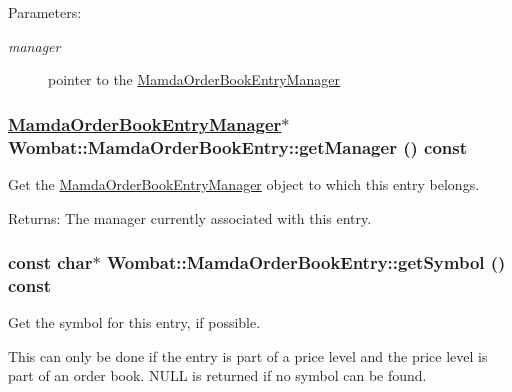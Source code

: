 \begin{Desc}
\item[Parameters:]
\begin{description}
\item[{\em manager}]pointer to the \hyperlink{classWombat_1_1MamdaOrderBookEntryManager}{Mamda\-Order\-Book\-Entry\-Manager} \end{description}
\end{Desc}
\hypertarget{classWombat_1_1MamdaOrderBookEntry_3f55243859e0552706d4ac6bfa762a36}{
\subsubsection[getManager]{\setlength{\rightskip}{0pt plus 5cm}\hyperlink{classWombat_1_1MamdaOrderBookEntryManager}{Mamda\-Order\-Book\-Entry\-Manager}$\ast$ Wombat::Mamda\-Order\-Book\-Entry::get\-Manager () const}}
\label{classWombat_1_1MamdaOrderBookEntry_3f55243859e0552706d4ac6bfa762a36}


Get the \hyperlink{classWombat_1_1MamdaOrderBookEntryManager}{Mamda\-Order\-Book\-Entry\-Manager} object to which this entry belongs. 

\begin{Desc}
\item[Returns:]The manager currently associated with this entry. \end{Desc}
\hypertarget{classWombat_1_1MamdaOrderBookEntry_fe56862c94f658e8d505bf9b3d2633e9}{
\subsubsection[getSymbol]{\setlength{\rightskip}{0pt plus 5cm}const char$\ast$ Wombat::Mamda\-Order\-Book\-Entry::get\-Symbol () const}}
\label{classWombat_1_1MamdaOrderBookEntry_fe56862c94f658e8d505bf9b3d2633e9}


Get the symbol for this entry, if possible. 

This can only be done if the entry is part of a price level and the price level is part of an order book. NULL is returned if no symbol can be found.

